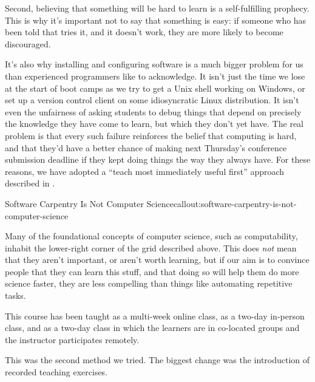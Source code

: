 Second, believing that something will be hard to learn is a
self-fulfilling prophecy. This is why it's important not to say that
something is easy: if someone who has been told that tries it, and it
doesn't work, they are more likely to become discouraged.

It's also why installing and configuring software is a much bigger
problem for us than experienced programmers like to acknowledge. It
isn't just the time we lose at the start of boot camps as we try to get
a Unix shell working on Windows, or set up a version control client on
some idiosyncratic Linux distribution. It isn't even the unfairness of
asking students to debug things that depend on precisely the knowledge
they have come to learn, but which they don't yet have. The real problem
is that every such failure reinforces the belief that computing is hard,
and that they'd have a better chance of making next Thursday's
conference submission deadline if they kept doing things the way they
always have. For these reasons, we have adopted a ``teach most
immediately useful first'' approach described in .

\begin{callout}{Software Carpentry Is Not Computer Science}{callout:software-carpentry-is-not-computer-science}

Many of the foundational concepts of computer science, such as
computability, inhabit the lower-right corner of the grid described
above. This does \emph{not} mean that they aren't important, or aren't
worth learning, but if our aim is to convince people that they can learn
this stuff, and that doing so will help them do more science faster,
they are less compelling than things like automating repetitive tasks.
\end{callout}


This course has been taught as a multi-week online class, as a two-day
in-person class, and as a two-day class in which the learners are in
co-located groups and the instructor participates remotely.


This was the second method we tried. The biggest change was the
introduction of recorded teaching exercises.

